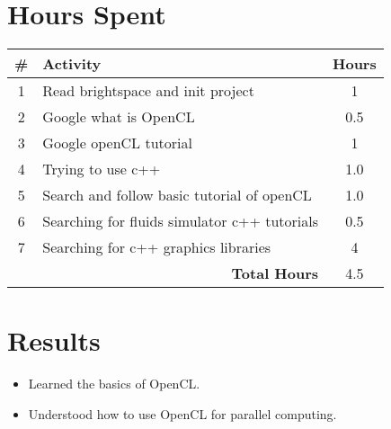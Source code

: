 \documentclass{article}
\begin{document}
\section*{Hours Spent}
\begin{tabular}{|c|l|c|}
    \hline
    \# & Activity & Hours \\
    \hline
    1 & Read brightspace and init project & 1 \\
    2 & Google what is OpenCL & 0.5 \\
    3 & Google openCL tutorial & 1 \\
    4 & Trying to use c++ & 1.0 \\
    5 & Search and follow basic tutorial of openCL & 1.0 \\
    6 & Searching for fluids simulator c++ tutorials & 0.5 \\
    7 & Searching for c++ graphics libraries & 4 \\
    \hline
    \multicolumn{2}{|r|}{\textbf{Total Hours}} & 4.5 \\
    \hline
\end{tabular}

\section*{Results}
\begin{itemize}
    \item Learned the basics of OpenCL.
    \item Understood how to use OpenCL for parallel computing.
\end{itemize}
\end{document}
